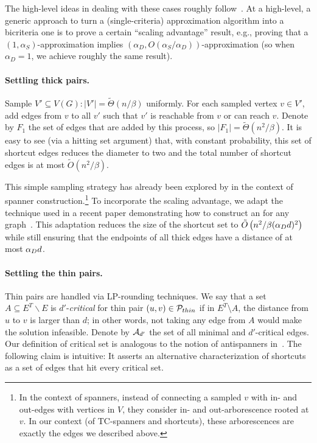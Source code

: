 The high-level ideas in dealing with these cases roughly follow~\cite{BermanBMRY13}. At a high-level, a generic approach to turn a (single-criteria) approximation algorithm into a bicriteria one is to prove a certain ``scaling advantage'' result, e.g., proving that a $(1,\alpha_S)$-approximation implies $(\alpha_D, O(\alpha_S/\alpha_D))$-approximation (so when $\alpha_D=1$, we achieve roughly the same result). 


 


\paragraph{Settling thick pairs.} Sample $V' \subseteq V(G): |V'| =  \tilde{\Theta}(n/\beta)$ uniformly. For each sampled vertex $v \in V'$, add edges from $v$ to all $v'$ such that $v'$ is reachable from $v$ or can reach $v$. 
Denote by $F_1$ the set of edges that are added by this process, so $|F_1| = \tilde{\Theta}(n^2/\beta)$. It is easy to see (via a hitting set argument) that, with constant probability, this set of shortcut edges reduces the diameter to two and the total number of shortcut edges is at most $\tilde O(n^2/\beta)$.


This simple sampling strategy has already been explored by \cite{BermanBMRY13} in the context of spanner construction.\footnote{In the context of spanners, instead of connecting a sampled $v$ with in- and out-edges with vertices in $V$, they consider in- and out-arborescence rooted at $v$. In our context (of TC-spanners and shortcuts), these arborescences are exactly the edges we described above.} 
To incorporate the scaling advantage, we adapt the technique used in a recent paper demonstrating how to construct an  for any graph~\cite{KoganP22}. This adaptation reduces the size of the shortcut set to $\tilde{O}\left(n^2/\beta(\alpha_D d)^2\right)$ while still ensuring that the endpoints of all thick edges   have a distance of at most $\alpha_D d$. 









\paragraph{Settling the thin pairs.} Thin pairs are handled via LP-rounding techniques. 
We say that a set $A\subseteq E^T \backslash E$ is $d'$-\textit{critical} for thin pair $(u,v) \in \mathcal{P}_{thin}$ if in $E^T \setminus A$, the distance from $u$ to $v$ is larger than $d$; in other words, not taking any edge from $A$ would make the solution infeasible. 
Denote by $\mathcal{A}_{d'}$ the set of all minimal and $d'$-critical edges.  
Our definition of critical set is analogous to the notion of antispanners in~\cite{BermanBMRY13}. The following claim is intuitive: It asserts an alternative characterization of shortcuts as a set of edges that hit every critical set. 


